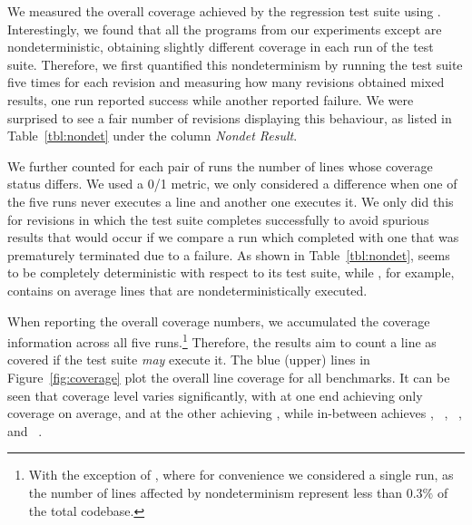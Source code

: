 We measured the overall coverage achieved by the regression test suite
using \gcov.  Interestingly, we found that all the programs from our
experiments except \binutils are nondeterministic, obtaining slightly
different coverage in each run of the test suite.  Therefore, we first
quantified this nondeterminism by running the test suite five times
for each revision and measuring how many revisions obtained mixed
results, \ie one run reported success while another reported failure.
We were surprised to see a fair number of revisions displaying this
behaviour, as listed in Table~\ref{tbl:nondet} under the column
\textit{Nondet Result}.


We further counted for each pair of runs the number of lines whose
coverage status differs. We used a 0/1 metric, \ie we only considered
a difference when one of the five runs never executes a line and
another one executes it. We only did this for revisions in which the
test suite completes successfully to avoid spurious results that would
occur if we compare a run which completed with one that was
prematurely terminated due to a failure.  As shown in
Table~\ref{tbl:nondet}, \binutils seems to be completely deterministic
with respect to its test suite, while \redis, for example, contains on
average \redisNonDetAverage lines that are nondeterministically
executed.

When reporting the overall coverage numbers, we accumulated the
coverage information across all five runs.\footnote{With the exception
of \git, where for convenience we considered a single run, as the
number of lines affected by nondeterminism represent less than
$0.3\%$ of the total codebase.} Therefore, the results aim to count a
line as covered if the test suite {\em may} execute it.  The blue
(upper) lines in Figure~\ref{fig:coverage} plot the overall line
coverage for all benchmarks.  It can be seen that coverage level
varies significantly, with \beanstalkd at one end achieving
only \beanstalkdCoverageAverage coverage on average, and \git at the
other achieving
\gitCoverageAverage, while in-between \lighttpdtwo achieves
\lighttpdtwoCoverageAverage, \redis~\redisCoverageAverage,
\zeromq~\zeromqCoverageAverage, and
\memcached~\memcachedCoverageAverage.

